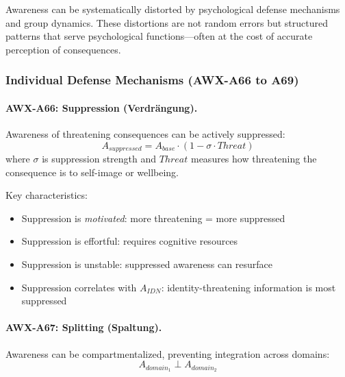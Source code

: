 
Awareness can be systematically distorted by psychological defense mechanisms 
and group dynamics. These distortions are not random errors but structured 
patterns that serve psychological functions—often at the cost of accurate 
perception of consequences.

\subsubsection{Individual Defense Mechanisms (AWX-A66 to A69)}

\paragraph{AWX-A66: Suppression (Verdrängung).}
Awareness of threatening consequences can be actively suppressed:
\begin{equation}
A_{suppressed} = A_{base} \cdot (1 - \sigma \cdot Threat)
\end{equation}
where $\sigma$ is suppression strength and $Threat$ measures how threatening 
the consequence is to self-image or wellbeing.

Key characteristics:
\begin{itemize}
    \item Suppression is \emph{motivated}: more threatening = more suppressed
    \item Suppression is effortful: requires cognitive resources
    \item Suppression is unstable: suppressed awareness can resurface
    \item Suppression correlates with $A_{IDN}$: identity-threatening 
          information is most suppressed
\end{itemize}

\paragraph{AWX-A67: Splitting (Spaltung).}
Awareness can be compartmentalized, preventing integration across domains:
\begin{equation}
A_{domain_1} \perp A_{domain_2}
\end{equation}

